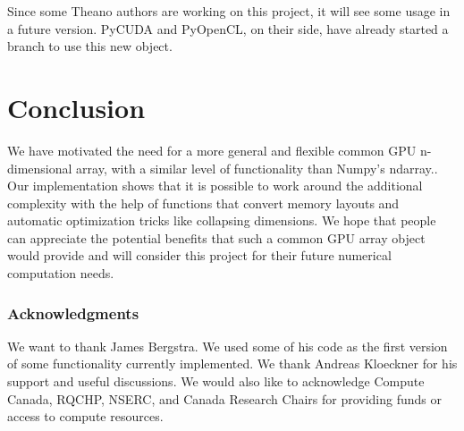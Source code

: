 \documentclass{article} %
\begin{document}
Since some Theano authors are working on this project, it will see some usage in a future version. PyCUDA and PyOpenCL, on their side, have already started a branch to use this new object.

\section{Conclusion}

We have motivated the need for a more general and flexible common GPU n-dimensional array, with a similar level of functionality than Numpy's ndarray..
Our implementation shows that it is possible to work around the additional complexity with the help of functions that convert memory layouts and automatic optimization tricks like collapsing dimensions.
We hope that people can appreciate the potential benefits that such a common GPU array object would provide and will consider this project for their future numerical computation needs.

\subsubsection*{Acknowledgments}

We want to thank James Bergstra. We used some of his code as the first version of some functionality currently implemented. We thank Andreas Kloeckner for his support and useful discussions. We would also like to acknowledge Compute Canada, RQCHP, NSERC, and Canada Research Chairs for providing funds or access to compute resources.




\end{document}
